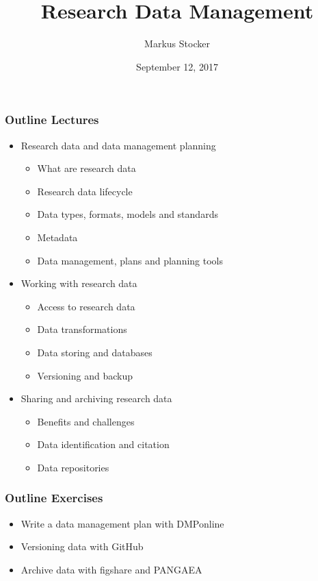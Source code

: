 \documentclass{beamer}
\title{Research Data Management}
\author{Markus Stocker}
\date{September 12, 2017}
\begin{document}
\maketitle

\begin{frame}
  \frametitle{Outline Lectures}
  
  \begin{itemize}
  \item Research data and data management planning
  \begin{itemize}
  \item What are research data
  \item Research data lifecycle
  \item Data types, formats, models and standards
  \item Metadata
  \item Data management, plans and planning tools
  \end{itemize}
  \item Working with research data
  \begin{itemize}
  \item Access to research data
  \item Data transformations
  \item Data storing and databases
  \item Versioning and backup
  \end{itemize}
  \item Sharing and archiving research data
  \begin{itemize}
  \item Benefits and challenges
  \item Data identification and citation
  \item Data repositories
  \end{itemize}
  \end{itemize}
  
\end{frame}

\begin{frame}
  \frametitle{Outline Exercises}
  
  \begin{itemize}
  \item Write a data management plan with DMPonline
  \item Versioning data with GitHub
  \item Archive data with figshare and PANGAEA
  \end{itemize}
  
\end{frame}
\end{document}
